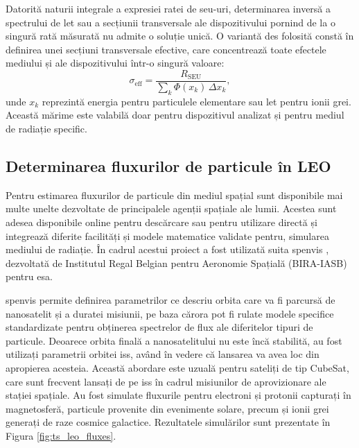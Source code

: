 \documentclass[12pt,a4paper]{report}
\begin{document}
Datorită naturii integrale a expresiei ratei de \gls{seu}-uri, determinarea inversă a spectrului de \gls{let} sau a secțiunii transversale ale dispozitivului pornind de la o singură rată măsurată nu admite o soluție unică. O variantă des folosită constă în definirea unei secțiuni transversale efective, care concentrează toate efectele mediului și ale dispozitivului într-o singură valoare:
\begin{equation}
\sigma_{\mathrm{eff}} = \frac{R_{\mathrm{SEU}}}{\displaystyle \sum_k \Phi(x_k)\,\Delta x_k},
\end{equation}
unde \(x_k\) reprezintă energia pentru particulele elementare sau \gls{let} pentru ionii grei. Această mărime este valabilă doar pentru dispozitivul analizat și pentru mediul de radiație specific.

\subsection{Determinarea fluxurilor de particule în LEO}
Pentru estimarea fluxurilor de particule din mediul spațial sunt disponibile mai multe unelte dezvoltate de principalele agenții spațiale ale lumii. Acestea sunt adesea disponibile online pentru descărcare sau pentru utilizare directă și integrează diferite facilități și modele matematice validate pentru, simularea mediului de radiație. În cadrul acestui proiect a fost utilizată suita \gls{spenvis} \cite{spenvis}, dezvoltată de Institutul Regal Belgian pentru Aeronomie Spațială (BIRA-IASB) pentru \gls{esa}.

\gls{spenvis} permite definirea parametrilor ce descriu orbita care va fi parcursă de nanosatelit și a duratei misiunii, pe baza cărora pot fi rulate modele specifice standardizate pentru obținerea spectrelor de flux ale diferitelor tipuri de particule. Deoarece orbita finală a nanosatelitului nu este încă stabilită, au fost utilizați parametrii orbitei \gls{iss}, având în vedere că lansarea va avea loc din apropierea acesteia. Această abordare este uzuală pentru sateliți de tip CubeSat, care sunt frecvent lansați de pe \gls{iss} în cadrul misiunilor de aprovizionare ale stației spațiale. Au fost simulate fluxurile pentru electroni și protonii capturați în magnetosferă, particule provenite din evenimente solare, precum și ionii grei generați de raze cosmice galactice. Rezultatele simulărilor sunt prezentate în Figura \ref{fig:ts_leo_fluxes}.

\end{document}
